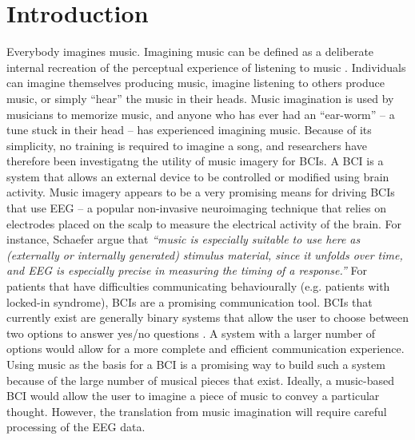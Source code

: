 \chapter{Introduction}

Everybody imagines music. Imagining music can be defined as a deliberate internal recreation of the perceptual experience of listening to music \cite{schaefer_name_2011}.
Individuals can imagine themselves producing music, imagine listening to others produce music, or simply ``hear'' the music in their heads. 
Music imagination is used by musicians to memorize music, and anyone who has ever had an ``ear-worm'' -- a tune stuck in their head -- has experienced imagining music. 
Because of its simplicity, no training is required to imagine a song, and researchers have therefore been investigatng the utility of music imagery for \acp{BCI}.
A \ac{BCI} is a system that allows an external device to be controlled or modified using brain activity. 
Music imagery appears to be a very promising means for driving \acp{BCI} that use \ac{EEG} -- a popular non-invasive neuroimaging technique that relies on electrodes placed on the scalp to measure the electrical activity of the brain.
For instance, Schaefer \etal\citeyear{schaefer_measuring_2011} argue that
\emph{``music is especially suitable to use here as (externally or internally generated) stimulus material, since it unfolds over time, and \ac{EEG} is especially precise in measuring the timing of a response.''}
For patients that have difficulties communicating behaviourally (e.g. patients with locked-in syndrome), \ac{BCI}s are a promising communication tool. 
{BCI}s that currently exist are generally binary systems that allow the user to choose between two options to answer yes/no questions \cite{Owen2006}.
A system with a larger number of options would allow for a more complete and efficient communication experience. 
Using music as the basis for a \ac{BCI} is a promising way to build such a system because of the large number of musical pieces that exist. 
Ideally, a music-based \ac{BCI} would allow the user to imagine a piece of music to convey a particular thought. 
However, the translation from music imagination will require careful processing of the EEG data. 

